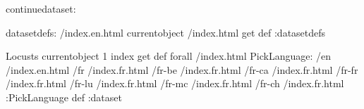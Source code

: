 \begin{ingrid}
continuedataset:

datasetdefs:
/index.en.html currentobject /index.html get def
:datasetdefs

{ Locusts } { currentobject 1 index get def } forall
/index.html {
PickLanguage:
/en /index.en.html
/fr /index.fr.html
/fr-be /index.fr.html
/fr-ca /index.fr.html
/fr-fr /index.fr.html
/fr-lu /index.fr.html
/fr-mc /index.fr.html
/fr-ch /index.fr.html
:PickLanguage
} def
:dataset
\end{ingrid}
